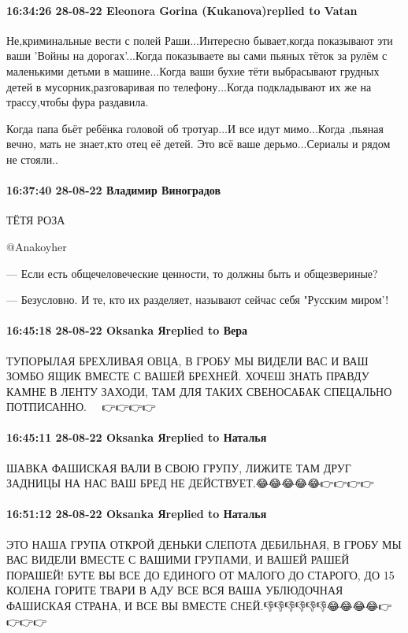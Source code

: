\paragraph{16:34:26 28-08-22 Eleonora Gorina (Kukanova)replied to Vatan}

Не,криминальные вести с полей Раши...Интересно бывает,когда показывают эти ваши
'Войны на дорогах'...Когда показываете вы сами пьяных тёток за рулём с
маленькими детьми в машине...Когда ваши бухие тёти выбрасывают грудных детей в
мусорник,разговаривая по телефону...Когда подкладывают их же на трассу,чтобы
фура раздавила.

Когда папа бьёт ребёнка головой об тротуар...И все идут мимо...Когда ,пьяная
вечно, мать не знает,кто отец её детей.  Это всё ваше дерьмо...Сериалы и рядом
не стояли..

\paragraph{16:37:40 28-08-22 Владимир Виноградов}

ТЁТЯ РОЗА

@Anakoyher

— Если есть общечеловеческие ценности, то должны быть и общезвериные?

— Безусловно. И те, кто их разделяет, называют сейчас себя "Русским миром'!

\paragraph{16:45:18 28-08-22 Oksanka Яreplied to Вера}

ТУПОРЫЛАЯ БРЕХЛИВАЯ ОВЦА, В ГРОБУ МЫ ВИДЕЛИ ВАС И ВАШ ЗОМБО ЯЩИК ВМЕСТЕ С ВАШЕЙ
БРЕХНЕЙ. ХОЧЕШ ЗНАТЬ ПРАВДУ КАМНЕ В ЛЕНТУ ЗАХОДИ, ТАМ ДЛЯ ТАКИХ СВЕНОСАБАК
СПЕЦАЛЬНО ПОТПИСАННО.🤣🤣🤣🤣🤣👉👉👉👉

\paragraph{16:45:11 28-08-22 Oksanka Яreplied to Наталья}

ШАВКА ФАШИСКАЯ ВАЛИ В СВОЮ ГРУПУ, ЛИЖИТЕ ТАМ ДРУГ ЗАДНИЦЫ НА НАС ВАШ БРЕД НЕ
ДЕЙСТВУЕТ.😂😂😂😂😂👉👉👉👉

\paragraph{16:51:12 28-08-22 Oksanka Яreplied to Наталья}

ЭТО НАША ГРУПА ОТКРОЙ ДЕНЬКИ СЛЕПОТА ДЕБИЛЬНАЯ, В ГРОБУ МЫ ВАС ВИДЕЛИ ВМЕСТЕ С
ВАШИМИ ГРУПАМИ, И ВАШЕЙ РАШЕЙ ПОРАШЕЙ! БУТЕ ВЫ ВСЕ ДО ЕДИНОГО ОТ МАЛОГО ДО
СТАРОГО, ДО 15 КОЛЕНА ГОРИТЕ ТВАРИ В АДУ ВСЕ ВСЯ ВАША УБЛЮДОЧНАЯ ФАШИСКАЯ
СТРАНА, И ВСЕ ВЫ ВМЕСТЕ СНЕЙ.👎👎👎👎👎👎😂😂😂😂👉👉👉👉

